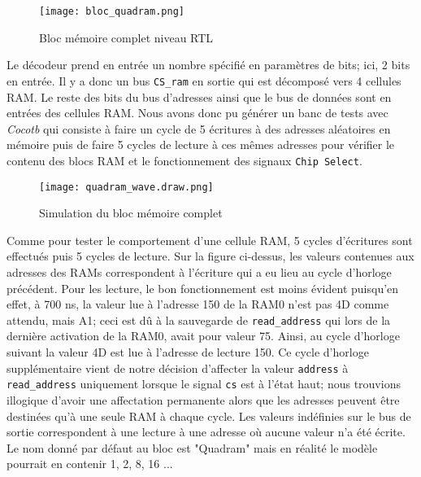 \begin{figure}[h]
	\centering
	\texttt{[image: bloc\_quadram.png]}
	\caption{Bloc mémoire complet niveau RTL}
	\label{fig:synth_bloc_quadram}
\end{figure}

\indent Le décodeur prend en entrée un nombre spécifié en paramètres de bits; ici, 2 bits en entrée.
Il y a donc un bus \texttt{CS\_ram} en sortie qui est décomposé vers 4 cellules \gls{RAM}. 
Le reste des bits du bus d'adresses ainsi que le bus de données sont en entrées des cellules \gls{RAM}.
Nous avons donc pu générer un banc de tests avec \textit{Cocotb} qui consiste à faire un cycle de 5 écritures à des adresses aléatoires en mémoire puis de faire 5 cycles de lecture à ces mêmes adresses pour vérifier le contenu des blocs \gls{RAM} et le fonctionnement des signaux \texttt{Chip Select}.

\newpage

\begin{figure}[h]
	\centering
	\texttt{[image: quadram\_wave.draw.png]}
	\caption{Simulation du bloc mémoire complet}
	\label{fig:wave_bloc_quadram}
\end{figure}

\indent Comme pour tester le comportement d'une cellule \gls{RAM}, 5 cycles d'écritures sont effectués puis 5 cycles de lecture.
Sur la figure ci-dessus, les valeurs contenues aux adresses des \gls{RAM}s correspondent à l'écriture qui a eu lieu au cycle d'horloge précédent.
Pour les lecture, le bon fonctionnement est moins évident puisqu'en effet, à 700 ns, la valeur lue à l'adresse 150 de la \gls{RAM}0 n'est pas 4D comme attendu, mais A1; ceci est dû à la sauvegarde de \texttt{read\_address} qui lors de la dernière activation de la \gls{RAM}0, avait pour valeur 75.
Ainsi, au cycle d'horloge suivant la valeur 4D est lue à l'adresse de lecture 150.
Ce cycle d'horloge supplémentaire vient de notre décision d'affecter la valeur \texttt{address} à \texttt{read\_address} uniquement lorsque le signal \texttt{cs} est à l'état haut; nous trouvions illogique d'avoir une affectation permanente alors que les adresses peuvent être destinées qu'à une seule \gls{RAM} à chaque cycle.
Les valeurs indéfinies sur le bus de sortie correspondent à une lecture à une adresse où aucune valeur n'a été écrite. \\

\indent Le nom donné par défaut au bloc est "Quadram" mais en réalité le modèle pourrait en contenir 1, 2, 8, 16 ...

